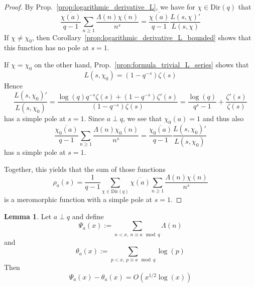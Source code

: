 \documentclass{scrartcl}
\theoremstyle{definition}
\newtheorem{lemma}[definition]{Lemma}
\begin{document}
\begin{proof}
    By Prop.~\ref{prop:logarithmic_derivative_L}, we have for $\chi \in \mathrm{Dir}(q)$ that
    \begin{equation*}
        \frac {\overline{\chi(a)}} {q - 1} \sum_{n \geq 1} \frac {\Lambda(n) \chi(n)} {n^s} = \frac {\overline{\chi(a)}} {q - 1} \frac {L(s, \chi)'} {L(s, \chi)}
    \end{equation*}
    If $\chi \neq \chi_0$, then Corollary~\ref{prop:logarithmic_derivative_L_bounded} shows that this function has no pole at $s = 1$.
    
    If $\chi = \chi_0$ on the other hand, Prop.~\ref{prop:formula_trivial_L_series} shows that
    \begin{equation*}
        L(s, \chi_0) = (1 - q^{-s}) \zeta(s)
    \end{equation*}
    Hence
    \begin{equation*}
        \frac {L(s, \chi_0)'} {L(s, \chi_0)} = \frac { \log(q)q^{-s} \zeta(s) + (1 - q^{-s}) \zeta'(s) } { (1 - q^{-s})\zeta(s) } = \frac {\log(q)} {q^s - 1} + \frac {\zeta'(s)} {\zeta(s)}
    \end{equation*}
    has a simple pole at $s = 1$.
    Since $a \perp q$, we see that $\chi_0(a) = 1$ and thus also
    \begin{equation*}
        \frac {\overline{\chi_0(a)}} {q - 1} \sum_{n \geq 1} \frac {\Lambda(n) \chi_0(n)} {n^s} = \frac {\overline{\chi_0(a)}} {q - 1} \frac {L(s, \chi_0)'} {L(s, \chi_0)}
    \end{equation*}
    has a simple pole at $s = 1$.

    Together, this yields that the sum of those functions
    \begin{equation*}
        \rho_a(s) = \frac 1 {q - 1} \sum_{\chi \in \mathrm{Dir}(q)} \overline{\chi(a)} \sum_{n \geq 1} \frac {\Lambda(n) \chi(n)} {n^s}
    \end{equation*}
    is a meromorphic function with a simple pole at $s = 1$.
\end{proof}
\begin{lemma}
    \label{prop:correlation_theta_Psi}
    Let $a \perp q$ and define
    \begin{equation*}
        \Psi_a(x) := \sum_{n < x, \ n \equiv a \mod q} \Lambda(n)
    \end{equation*}
    and
    \begin{equation*}
        \theta_a(x) := \sum_{p < x, \ p \equiv a \mod q} \log(p)
    \end{equation*}
    Then
    \begin{equation*}
        \Psi_a(x) - \theta_a(x) = O(x^{1/2}\log(x))
    \end{equation*}
\end{lemma}
\end{document}
